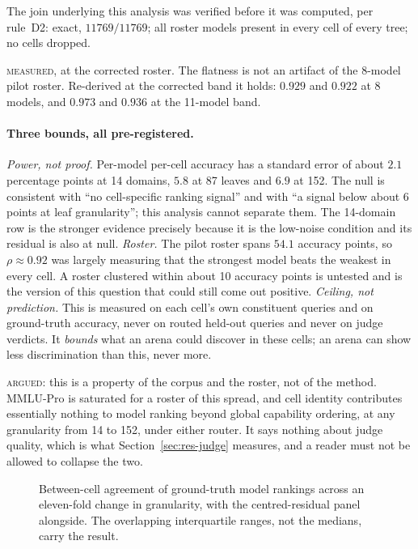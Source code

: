 The join underlying this analysis was verified before it was computed,
per rule~D2: exact, $11769/11769$; all roster models present in every
cell of every tree; no cells dropped.

\textsc{measured}, at the corrected roster. The flatness is not an
artifact of the 8-model pilot roster. Re-derived at the corrected band
it holds: $0.929$ and $0.922$ at 8 models, and $0.973$ and $0.936$ at
the 11-model band.

\paragraph{Three bounds, all pre-registered.}
\emph{Power, not proof.} Per-model per-cell accuracy has a standard
error of about $2.1$ percentage points at 14 domains, $5.8$ at 87
leaves and $6.9$ at 152. The null is consistent with ``no cell-specific
ranking signal'' and with ``a signal below about 6 points at leaf
granularity''; this analysis cannot separate them. The 14-domain row is
the stronger evidence precisely because it is the low-noise condition
and its residual is also at null.
\emph{Roster.} The pilot roster spans $54.1$ accuracy points, so
$\rho \approx 0.92$ was largely measuring that the strongest model beats
the weakest in every cell. A roster clustered within about 10 accuracy
points is untested and is the version of this question that could still
come out positive.
\emph{Ceiling, not prediction.} This is measured on each cell's own
constituent queries and on ground-truth accuracy, never on routed
held-out queries and never on judge verdicts. It \emph{bounds} what an
arena could discover in these cells; an arena can show less
discrimination than this, never more.

\textsc{argued}: this is a property of the corpus and the roster, not
of the method. MMLU-Pro is saturated for a roster of this spread, and
cell identity contributes essentially nothing to model ranking beyond
global capability ordering, at any granularity from 14 to 152, under
either router. It says nothing about judge quality, which is what
Section~\ref{sec:res-judge} measures, and a reader must not be allowed
to collapse the two.

\begin{figure}[htbp]
\centering
{}
\caption{Between-cell agreement of ground-truth model rankings across
an eleven-fold change in granularity, with the centred-residual panel
alongside. The overlapping interquartile ranges, not the medians, carry
the result.}
\label{fig:granularity-flat}
\end{figure}

